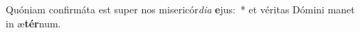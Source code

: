 \item Quóniam confirmáta est super nos misericór\textit{di}\textit{a} \textbf{e}jus:~* et véritas Dómini manet in æ\textbf{tér}num.
